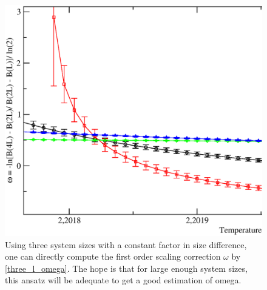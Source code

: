 %
\begin{figure}[!htpb]
  \centering
  \includegraphics[width=\textwidth]{./plots/3DXY/vsO/three_L_BinderCumuland.eps}
  \caption{Using three system sizes with a constant factor in size difference, one can directly compute the first order scaling correction $\omega$ by \ref{three_l_omega}. The hope is that for large enough system sizes, this ansatz will be adequate to get a good estimation of omega.}
\end{figure}

